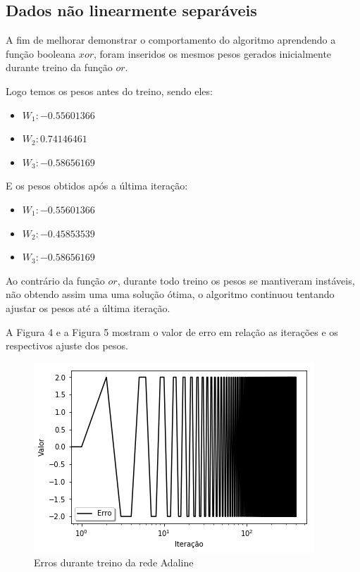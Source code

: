 \documentclass[a4paper,11pt]{article}
\begin{document}
		\subsection{Dados não linearmente separáveis}
	
			A fim de melhorar demonstrar o comportamento do algoritmo aprendendo a função booleana $xor$, foram inseridos os mesmos pesos gerados inicialmente durante treino da função $or$.
			
			Logo temos os pesos antes do treino, sendo eles:
			\begin{itemize}[label={}]
				\item $W_1: -0.55601366$
				\item $W_2:  0.74146461$
				\item $W_3: -0.58656169$
			\end{itemize}
			E os pesos obtidos após a última iteração:
			\begin{itemize}[label={}]
				\item $W_1: -0.55601366$
				\item $W_2: -0.45853539$
				\item $W_3: -0.58656169$
			\end{itemize}
			
			Ao contrário da função $or$, durante todo treino os pesos se mantiveram instáveis, não obtendo assim uma uma solução ótima, o algoritmo continuou tentando ajustar os pesos até a última iteração.
			
			A Figura 4 e a Figura 5 mostram o valor de erro em relação as iterações e os respectivos ajuste dos pesos.
			
			\begin{figure}[H]
				\centering
				\includegraphics[width=0.7\linewidth]{Figuras/Resultado03}
				\caption[Resultado XOR 01]{Erros durante treino da rede Adaline}
				\label{fig:resultado03}
			\end{figure}
			
\end{document}
